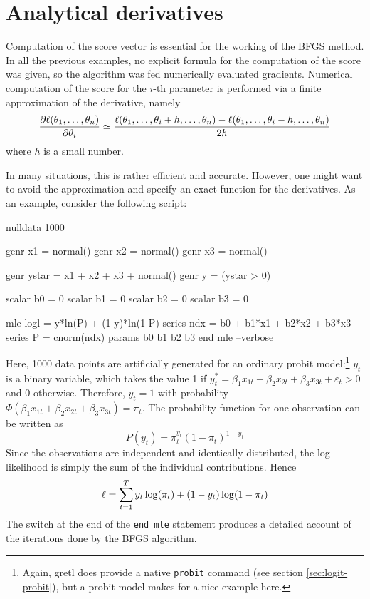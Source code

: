 \section{Analytical derivatives}
\label{sec:anal-der}

Computation of the score vector is essential for the working of the
BFGS method. In all the previous examples, no explicit formula for the
computation of the score was given, so the algorithm was fed
numerically evaluated gradients. Numerical computation of the score for
the $i$-th parameter is performed via a finite approximation of the
derivative, namely
\[
  \frac{\partial \ell(\theta_1, \ldots, \theta_n)}{\partial \theta_i} \simeq 
  \frac{\ell(\theta_1, \ldots, \theta_i + h, \ldots, \theta_n) -
    \ell(\theta_1, \ldots, \theta_i - h, \ldots, \theta_n)}{2h}
\]
where $h$ is a small number. 

In many situations, this is rather efficient and accurate. However,
one might want to avoid the approximation and specify an exact
function for the derivatives. As an example, consider the following
script:
%
\begin{code}
nulldata 1000

genr x1 = normal()
genr x2 = normal()
genr x3 = normal()

genr ystar = x1 + x2 + x3 + normal()
genr y = (ystar > 0)

scalar b0 = 0
scalar b1 = 0
scalar b2 = 0
scalar b3 = 0

mle logl = y*ln(P) + (1-y)*ln(1-P)
  series ndx = b0 + b1*x1 + b2*x2 + b3*x3
  series P = cnorm(ndx)
  params b0 b1 b2 b3
end mle --verbose
\end{code}

Here, 1000 data points are artificially generated for an ordinary
probit model:\footnote{Again, gretl does provide a native
  \texttt{probit} command (see section \ref{sec:logit-probit}), but a
  probit model makes for a nice example here.} $y_t$ is a binary
variable, which takes the value 1 if $y_t^* = \beta_1 x_{1t} + \beta_2
x_{2t} + \beta_3 x_{3t} + \varepsilon_t > 0$ and 0 otherwise.
Therefore, $y_t = 1$ with probability $\Phi(\beta_1 x_{1t} + \beta_2
x_{2t} + \beta_3 x_{3t}) = \pi_t$.  The probability function for one
observation can be written as
\[
  P(y_t) = \pi_t^{y_t} ( 1 -\pi_t )^{1-y_t}
\]
Since the observations are independent and identically distributed,
the log-likelihood is simply the sum of the individual
contributions. Hence
\[
  \ell = \sum_{t=1}^T y_t \log(\pi_t) + (1 - y_t) \log(1 - \pi_t)
\]
The  switch at the end of the \texttt{end mle}
statement produces a detailed account of the iterations done by the
BFGS algorithm.

